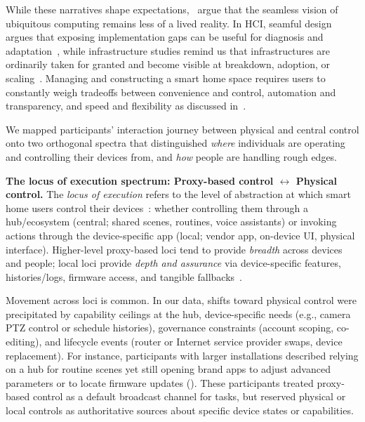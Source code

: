 While these narratives shape expectations,~\citet{bell2007yesterday} argue that the seamless vision of ubiquitous computing remains less of a lived reality. In HCI, seamful design argues that exposing implementation gaps can be useful for diagnosis and adaptation~\cite{chalmers2003seamful, chalmersSeamfulDesignShowing2003}, while infrastructure studies remind us that infrastructures are ordinarily taken for granted and become visible at breakdown, adoption, or scaling~\cite{star1994infra}. Managing and constructing a smart home space requires users to constantly weigh tradeoffs between convenience and control, automation and transparency, and speed and flexibility as discussed in~.

We mapped participants' interaction journey between physical and central control onto two orthogonal spectra that distinguished \emph{where} individuals are operating and controlling their devices from, and \emph{how} people are handling rough edges.

\noindent\textbf{The locus of execution spectrum: Proxy-based control $\leftrightarrow$ Physical control.}
The \emph{locus of execution} refers to the level of abstraction at which smart home users control their devices~\cite{perrault2015physical, rip2002identifying}: whether controlling them through a hub/ecosystem (central; shared scenes, routines, voice assistants) or invoking actions through the device-specific app (local; vendor app, on-device UI, physical interface). Higher-level proxy-based loci tend to provide \emph{breadth} across devices and people; local loci provide \emph{depth and assurance} via device-specific features, histories/logs, firmware access, and tangible fallbacks~\cite{chen2025expressing, corno2021users}. 

Movement across loci is common. In our data, shifts toward physical control were precipitated by capability ceilings at the hub, device-specific needs (e.g., camera PTZ control or schedule histories), governance constraints (account scoping, co-editing), and lifecycle events (router or Internet service provider swaps, device replacement). For instance, participants with larger installations described relying on a hub for routine scenes yet still opening brand apps to adjust advanced parameters or to locate firmware updates (). These participants treated proxy-based control as a default broadcast channel for tasks, but reserved physical or local controls as authoritative sources about specific device states or capabilities.

